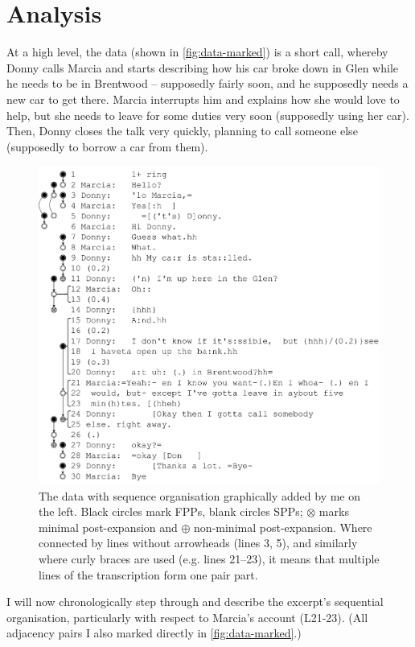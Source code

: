 \documentclass[11pt]{article}
\begin{document}
\section{Analysis}{
	At a high level, the data (shown in \autoref{fig:data-marked}) is a short call, whereby Donny calls Marcia and starts describing how his car broke down in Glen while he needs to be in Brentwood -- supposedly fairly soon, and he supposedly needs a new car to get there. Marcia interrupts him and explains how she would love to help, but she needs to leave for some duties very soon (supposedly using her car). Then, Donny closes the talk very quickly, planning to call someone else (supposedly to borrow a car from them).

	\begin{figure}[h!tb]
		\centering
		\includegraphics[width=\columnwidth]{../data-marked.pdf}
		\caption{The data with sequence organisation graphically added by me on the left. Black circles mark FPPs, blank circles SPPs; $\boldsymbol{\mathbf{\otimes}}$ marks minimal post-expansion and $\boldsymbol{\mathbf{\oplus}}$ non-minimal post-expansion. Where connected by lines without arrowheads (lines 3, 5), and similarly where curly braces are used (e.g. lines 21--23), it means that multiple lines of the transcription form one pair part.}
		\label{fig:data-marked}
	\end{figure}

	I will now chronologically step through and describe the excerpt's sequential organisation, particularly with respect to Marcia's account (L21-23). (All adjacency pairs I also marked directly in \autoref{fig:data-marked}.)

}
\end{document}
